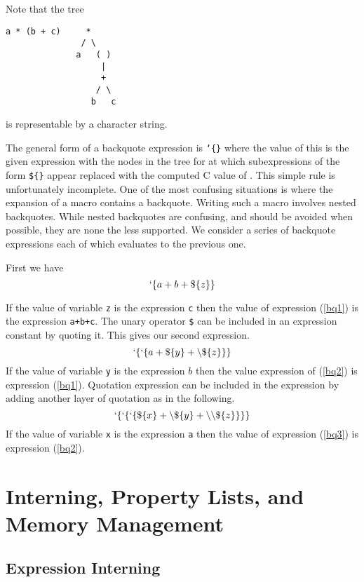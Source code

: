 \documentclass{article}
\begin{document}
Note that the tree
\begin{verbatim}
a * (b + c)     *
               / \
              a   ( )
                   |
                   +
                  / \
                 b   c
\end{verbatim}
is representable by a character string.

The general form of a backquote expression is {\tt `\{<exp1>\}} where the value of this is the given expression {\tt <exp1>} with the nodes
in the tree for {\tt <exp1>} at which subexpressions
of the form {\tt \$\{<exp2>\}} appear replaced with the computed C value of {\tt <exp2>}.  This simple rule is unfortunately incomplete.  One of the most
confusing situations is where the expansion of a macro contains a backquote.  Writing such a macro involves nested backquotes.  While nested backquotes
are confusing, and should be avoided when possible, they are none the less supported.  We consider a series of backquote expressions each of which evaluates to the previous one.

First we have
\begin{equation}
\label{bq1}
`\{a+b+\$\{z\}\}
\end{equation}

If the value of variable {\tt z} is the expression {\tt c} then the value of expression (\ref{bq1}) is the expression {\tt a+b+c}.
The unary operator {\tt \$} can be included in an expression constant by quoting it.  This gives our second expression.
\begin{equation}
\label{bq2}
`\{`\{a + \$\{y\} + \backslash\$\{z\}\}\}
\end{equation}
If the value of variable {\tt y} is the expression $b$ then the value expression of (\ref{bq2}) is expression (\ref{bq1}).
Quotation expression can be included in the expression by adding another layer of quotation as in the following.
\begin{equation}
\label{bq3}
`\{`\{`\{\$\{x\} + \backslash\$\{y\} + \backslash\backslash\$\{z\}\}\}\}
\end{equation}
If the value of variable {\tt x} is the expression {\tt a} then the value of expression (\ref{bq3}) is expression (\ref{bq2}).

\section{Interning, Property Lists, and Memory Management}

\subsection{Expression Interning}
\end{document}

